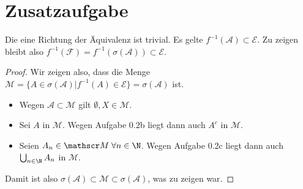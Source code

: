 \documentclass{article}
\begin{document}
    \section*{Zusatzaufgabe}
    Die eine Richtung der Äquivalenz ist trivial.
    Es gelte $f^{-1}(\mathscr A) \subset \mathscr E$.
    Zu zeigen bleibt also $f^{-1}(\mathscr F)  = f^{-1}(\sigma(\mathscr A)) \subset \mathscr E$.
    \begin{proof}
        Wir zeigen also, dass die Menge $\mathscr M = \{A \in \sigma(\mathscr A)| f^{-1}(A) \in \mathscr E\} = \mathscr \sigma(\mathscr A)$ ist. 
        \begin{itemize}
            \item  Wegen $\mathscr A \subset \mathscr M$ gilt $\emptyset, X \in \mathscr M$.
            \item Sei $A$ in $\mathscr M$. Wegen Aufgabe 0.2b liegt dann auch $A^c$ in $\mathscr M$.
            \item Seien $A_n \in \mathscr M\; \forall n\in \N$. Wegen Aufgabe 0.2c liegt dann auch $\bigcup_{n\in \N} A_n$ in $\mathscr M$.
        \end{itemize}
        Damit ist also $\sigma(\mathscr A) \subset \mathscr M \subset \sigma(\mathscr A)$, was zu zeigen war.
    \end{proof}
\end{document}
